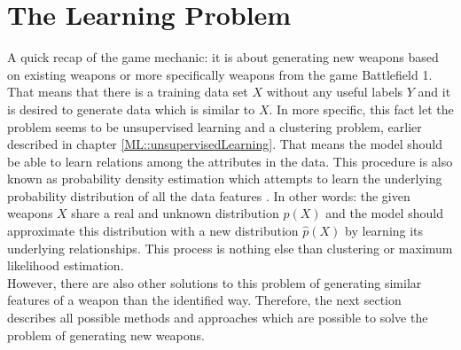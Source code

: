 \documentclass[MGS,Master,english]{twbook}%
\begin{document}
\section{The Learning Problem}
A quick recap of the game mechanic: it is about generating new weapons based on existing weapons or more specifically weapons from the game Battlefield 1. That means that there is a training data set $X$ without any useful labels $Y$ and it is desired to generate data which is similar to $X$. In more specific, this fact let the problem seems to be unsupervised learning and a clustering problem, earlier described in chapter \ref{ML::unsupervisedLearning}. That means the model should be able to learn relations among the attributes in the data. This procedure is also known as probability density estimation which attempts to learn the underlying probability distribution of all the data features \cite{ml::vae::tutorial}. In other words: the given weapons $X$ share a real and unknown distribution $p(X)$ and the model should approximate this distribution with a new distribution $\hat{p}(X)$ by learning its underlying relationships. This process is nothing else than clustering or maximum likelihood estimation. \\
However, there are also other solutions to this problem of generating similar features of a weapon than the identified way. Therefore, the next section describes all possible methods and approaches which are possible to solve the problem of generating new weapons.
\end{document}
